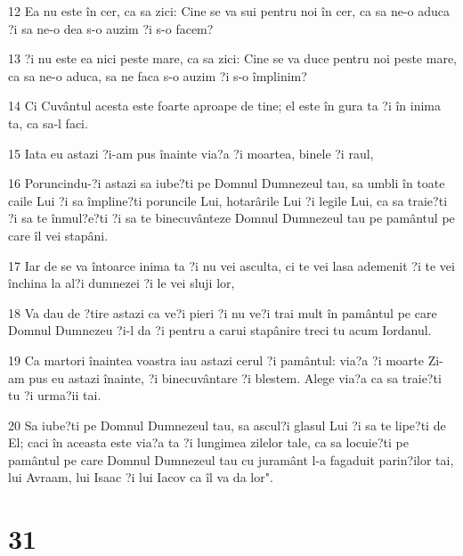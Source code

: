 \par 12 Ea nu este în cer, ca sa zici: Cine se va sui pentru noi în cer, ca sa ne-o aduca ?i sa ne-o dea s-o auzim ?i s-o facem?
\par 13 ?i nu este ea nici peste mare, ca sa zici: Cine se va duce pentru noi peste mare, ca sa ne-o aduca, sa ne faca s-o auzim ?i s-o împlinim?
\par 14 Ci Cuvântul acesta este foarte aproape de tine; el este în gura ta ?i în inima ta, ca sa-l faci.
\par 15 Iata eu astazi ?i-am pus înainte via?a ?i moartea, binele ?i raul,
\par 16 Poruncindu-?i astazi sa iube?ti pe Domnul Dumnezeul tau, sa umbli în toate caile Lui ?i sa împline?ti poruncile Lui, hotarârile Lui ?i legile Lui, ca sa traie?ti ?i sa te înmul?e?ti ?i sa te binecuvânteze Domnul Dumnezeul tau pe pamântul pe care îl vei stapâni.
\par 17 Iar de se va întoarce inima ta ?i nu vei asculta, ci te vei lasa ademenit ?i te vei închina la al?i dumnezei ?i le vei sluji lor,
\par 18 Va dau de ?tire astazi ca ve?i pieri ?i nu ve?i trai mult în pamântul pe care Domnul Dumnezeu ?i-l da ?i pentru a carui stapânire treci tu acum Iordanul.
\par 19 Ca martori înaintea voastra iau astazi cerul ?i pamântul: via?a ?i moarte Zi-am pus eu astazi înainte, ?i binecuvântare ?i blestem. Alege via?a ca sa traie?ti tu ?i urma?ii tai.
\par 20 Sa iube?ti pe Domnul Dumnezeul tau, sa ascul?i glasul Lui ?i sa te lipe?ti de El; caci în aceasta este via?a ta ?i lungimea zilelor tale, ca sa locuie?ti pe pamântul pe care Domnul Dumnezeul tau cu juramânt l-a fagaduit parin?ilor tai, lui Avraam, lui Isaac ?i lui Iacov ca îl va da lor".

\chapter{31}

